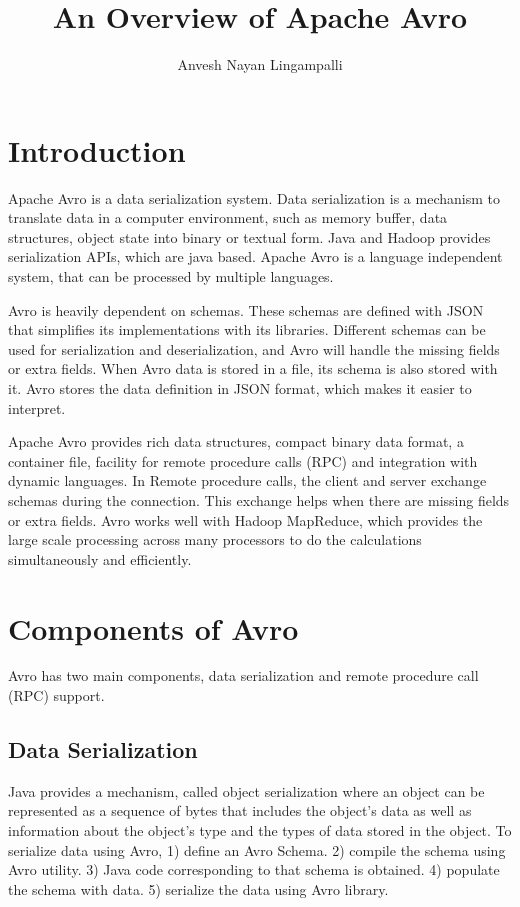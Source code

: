 \documentclass[9pt,twocolumn,twoside]{../../styles/osajnl}
\title{An Overview of Apache Avro}
\author[1]{Anvesh Nayan Lingampalli}
\affil[1]{School of Informatics and Computing, Bloomington, IN 47408, U.S.A.}
\affil[*]{Corresponding authors: anveling@umail.iu.edu}
\begin{document}
\maketitle

\section{Introduction} 

Apache Avro is a data serialization system. Data serialization is a
mechanism to translate data in a computer environment, such as memory
buffer, data structures, object state into binary or textual form.
Java and Hadoop provides serialization APIs, which are java
based. Apache Avro is a language independent system, that can be
processed by multiple languages.

Avro is heavily dependent on schemas. These schemas are defined with
JSON that simplifies its implementations with its libraries. Different
schemas can be used for serialization and deserialization, and Avro
will handle the missing fields or extra fields. When Avro data is
stored in a file, its schema is also stored with it. Avro stores the
data definition in JSON format, which makes it easier to interpret.

Apache Avro provides rich data structures, compact binary data format,
a container file, facility for remote procedure calls (RPC) and
integration with dynamic languages. In Remote procedure calls, the
client and server exchange schemas during the connection. This
exchange helps when there are missing fields or extra fields.  Avro
works well with Hadoop MapReduce, which provides the large scale
processing across many processors to do the calculations
simultaneously and efficiently.

\section{Components of Avro}

Avro has two main components, data serialization and remote procedure
call (RPC) support.

\subsection{Data Serialization}

Java provides a mechanism, called object serialization where an object
can be represented as a sequence of bytes that includes the object's
data as well as information about the object's type and the types of
data stored in the object. To serialize data using Avro,
1) define an Avro Schema.
2) compile the schema using Avro utility.
3) Java code corresponding to that schema is obtained.
4) populate the schema with data.
5) serialize the data using Avro library.
\end{document}
